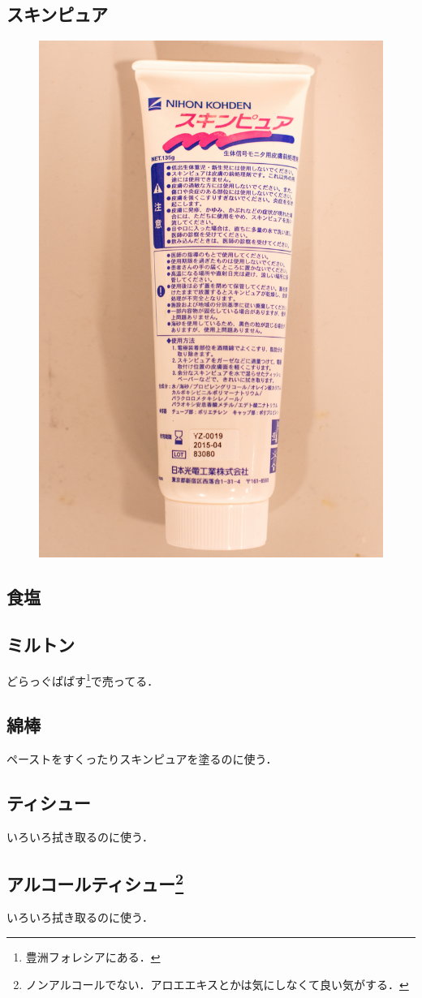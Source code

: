 \documentclass[a4j, twocolumn, openleft, uplatex, dvipdfmx]{jsbook}
\begin{document}
        \subsection*{スキンピュア}
            \begin{figure}[H]
                \centering
                \includegraphics[width=0.5\linewidth]{./figure/skinpure.jpg}
            \end{figure}
        \subsection*{食塩}
        \subsection*{ミルトン}
            どらっぐぱぱす\footnote{豊洲フォレシアにある．}で売ってる．
        \subsection*{綿棒}
            ペーストをすくったりスキンピュアを塗るのに使う．
        \subsection*{ティシュー}
            いろいろ拭き取るのに使う．
        \subsection*{アルコールティシュー\footnote{ノンアルコールでない．アロエエキスとかは気にしなくて良い気がする．}}
            いろいろ拭き取るのに使う．
\end{document}
